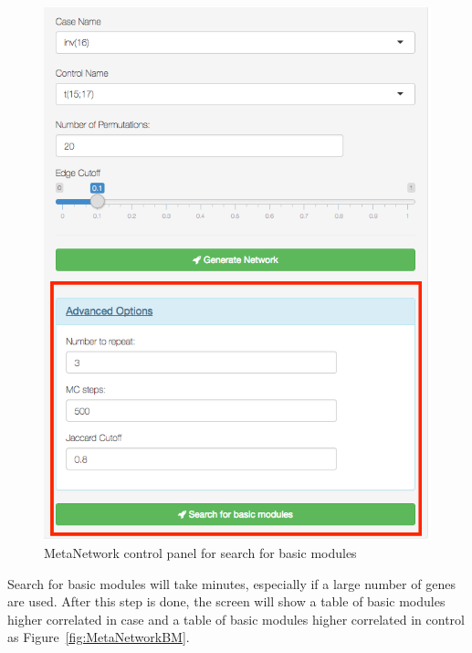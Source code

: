 \begin{steps}
\begin{figure}[H]
\begin{center}
\includegraphics[scale=0.35]{./figure/MetaNetwork/MetaNetworkstep2}
\caption{MetaNetwork control panel for search for basic modules}
\label{fig:MetaNetworkstep2}
\end{center}
\end{figure}

Search for basic modules will take minutes, especially if a large number of genes are used. After this step is done, the screen will show a table of basic modules higher correlated in case and a table of basic modules higher correlated in control as Figure~\ref{fig:MetaNetworkBM}. 


\end{steps}
